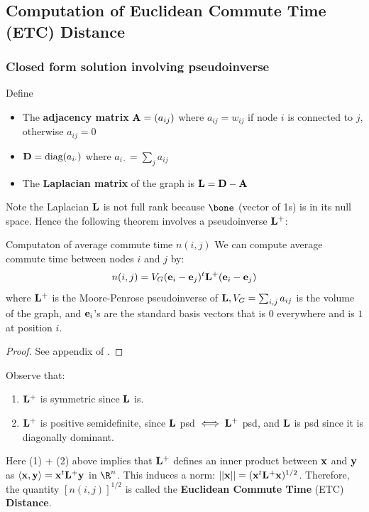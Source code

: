 \documentclass[./some_latex_template.tex]{subfiles}
\begin{document}
\subsection{Computation of Euclidean Commute Time (ETC) Distance}

\subsubsection{Closed form solution involving pseudoinverse}

Define 
\begin{itemize}
	\item The \textbf{adjacency matrix} $\mathbf{A} = (a_{ij})$ where $a_{ij} = w_{ij}$ if node $i$ is connected to $j$, otherwise $a_{ij} = 0$
	\item $\mathbf{D} = \text{diag}(a_{i\cdot})$  where $a_{i\cdot} = \sum_{j}a_{ij}$
	\item The \textbf{Laplacian matrix} of the graph is $\mathbf{L} = \mathbf{D} - \mathbf{A}$
\end{itemize}

\noindent Note the Laplacian $\mathbf{L}$ is not full rank because $\bone$ (vector of 1s) is in its null space. Hence the following theorem involves a pseudoinverse $\mathbf{L}^+$: 

\begin{theorembox}{Computaton of average commute time $n(i, j)$}{}
We can compute average commute time between nodes $i$ and $j$ by:
\begin{align*}
	n(i, j) = V_G (\mathbf{e}_i - \mathbf{e}_j)^t\mathbf{L}^+(\mathbf{e}_i - \mathbf{e}_j)
\end{align*}
where $\mathbf{L}^+$ is the Moore-Penrose pseudoinverse of $\mathbf{L}, V_G = \sum_{i,j} a_{ij}$ is the volume of the graph, and $\mathbf{e}_i$'s are the standard basis vectors that is $0$ everywhere and is $1$ at position $i$. 
\end{theorembox}
\begin{proof}
See appendix of \cite{fouss2007random}. 
\end{proof}

\noindent Observe that:
\begin{enumerate}
	\item $\mathbf{L}^+$ is symmetric since $\mathbf{L}$ is. 
	\item $\mathbf{L}^+$ is positive semidefinite, since $\mathbf{L}$ psd $\iff \mathbf{L}^+$ psd, and $\mathbf{L}$ is psd since it is diagonally dominant. 
\end{enumerate}

\noindent Here (1) + (2) above implies that $\mathbf{L}^+$ defines an inner product between $\mathbf{x}$ and $\mathbf{y}$ as $\langle\mathbf{x}, \mathbf{y}\rangle = \mathbf{x}^t\mathbf{L}^+\mathbf{y}$ in $\R^n$. This induces a norm: $||\mathbf{x}|| = (\mathbf{x}^t\mathbf{L}^+\mathbf{x})^{1/2}$. Therefore, the quantity $[n(i, j)]^{1/2}$ is called the \textbf{Euclidean Commute Time} (ETC) \textbf{Distance}. 
\end{document}
